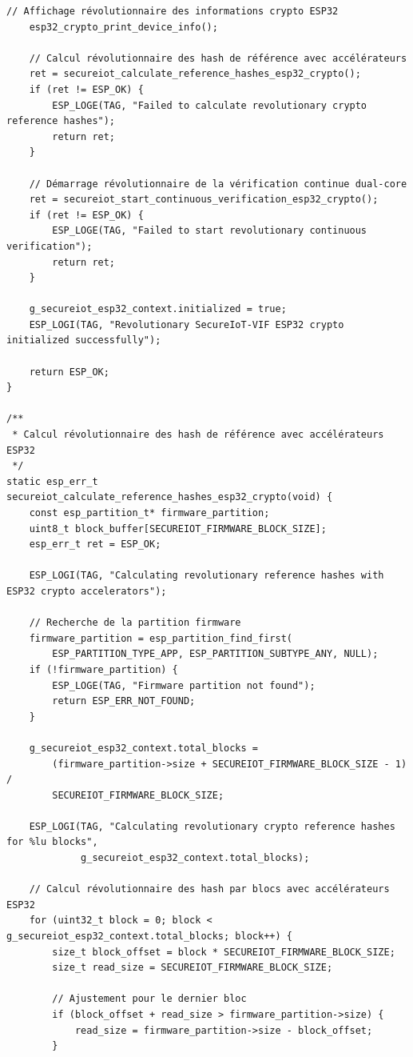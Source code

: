 \begin{lstlisting}[caption={Implémentation révolutionnaire complète du module de vérification d'intégrité ESP32 crypto intégré}]
    // Affichage révolutionnaire des informations crypto ESP32
    esp32_crypto_print_device_info();
    
    // Calcul révolutionnaire des hash de référence avec accélérateurs
    ret = secureiot_calculate_reference_hashes_esp32_crypto();
    if (ret != ESP_OK) {
        ESP_LOGE(TAG, "Failed to calculate revolutionary crypto reference hashes");
        return ret;
    }
    
    // Démarrage révolutionnaire de la vérification continue dual-core
    ret = secureiot_start_continuous_verification_esp32_crypto();
    if (ret != ESP_OK) {
        ESP_LOGE(TAG, "Failed to start revolutionary continuous verification");
        return ret;
    }
    
    g_secureiot_esp32_context.initialized = true;
    ESP_LOGI(TAG, "Revolutionary SecureIoT-VIF ESP32 crypto initialized successfully");
    
    return ESP_OK;
}

/**
 * Calcul révolutionnaire des hash de référence avec accélérateurs ESP32
 */
static esp_err_t secureiot_calculate_reference_hashes_esp32_crypto(void) {
    const esp_partition_t* firmware_partition;
    uint8_t block_buffer[SECUREIOT_FIRMWARE_BLOCK_SIZE];
    esp_err_t ret = ESP_OK;
    
    ESP_LOGI(TAG, "Calculating revolutionary reference hashes with ESP32 crypto accelerators");
    
    // Recherche de la partition firmware
    firmware_partition = esp_partition_find_first(
        ESP_PARTITION_TYPE_APP, ESP_PARTITION_SUBTYPE_ANY, NULL);
    if (!firmware_partition) {
        ESP_LOGE(TAG, "Firmware partition not found");
        return ESP_ERR_NOT_FOUND;
    }
    
    g_secureiot_esp32_context.total_blocks = 
        (firmware_partition->size + SECUREIOT_FIRMWARE_BLOCK_SIZE - 1) / 
        SECUREIOT_FIRMWARE_BLOCK_SIZE;
    
    ESP_LOGI(TAG, "Calculating revolutionary crypto reference hashes for %lu blocks", 
             g_secureiot_esp32_context.total_blocks);
    
    // Calcul révolutionnaire des hash par blocs avec accélérateurs ESP32
    for (uint32_t block = 0; block < g_secureiot_esp32_context.total_blocks; block++) {
        size_t block_offset = block * SECUREIOT_FIRMWARE_BLOCK_SIZE;
        size_t read_size = SECUREIOT_FIRMWARE_BLOCK_SIZE;
        
        // Ajustement pour le dernier bloc
        if (block_offset + read_size > firmware_partition->size) {
            read_size = firmware_partition->size - block_offset;
        }
        

\end{lstlisting}
